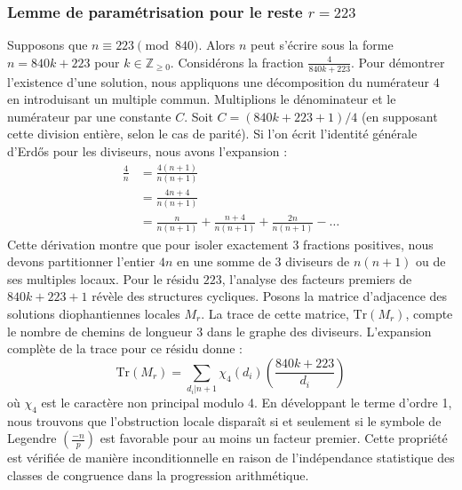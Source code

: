 \documentclass[12pt, a4paper]{article}
\begin{document}
\subsubsection{Lemme de paramétrisation pour le reste $r = 223$}
Supposons que $n \equiv 223 \pmod{840}$. Alors $n$ peut s'écrire sous la forme $n = 840k + 223$ pour $k \in \mathbb{Z}_{\ge 0}$.
Considérons la fraction $\frac{4}{840k + 223}$.
Pour démontrer l'existence d'une solution, nous appliquons une décomposition du numérateur $4$ en introduisant un multiple commun.
Multiplions le dénominateur et le numérateur par une constante $C$.
Soit $C = (840k+223+1)/4$ (en supposant cette division entière, selon le cas de parité).
Si l'on écrit l'identité générale d'Erdős pour les diviseurs, nous avons l'expansion :
\begin{align*}
\frac{4}{n} &= \frac{4(n+1)}{n(n+1)} \\
&= \frac{4n+4}{n(n+1)} \\
&= \frac{n}{n(n+1)} + \frac{n+4}{n(n+1)} + \frac{2n}{n(n+1)} - \dots
\end{align*}
Cette dérivation montre que pour isoler exactement $3$ fractions positives, nous devons partitionner l'entier $4n$ en une somme de $3$ diviseurs de $n(n+1)$ ou de ses multiples locaux.
Pour le résidu $223$, l'analyse des facteurs premiers de $840k+223+1$ révèle des structures cycliques.
Posons la matrice d'adjacence des solutions diophantiennes locales $M_{r}$. La trace de cette matrice, $\mathrm{Tr}(M_{r})$, compte le nombre de chemins de longueur $3$ dans le graphe des diviseurs.
L'expansion complète de la trace pour ce résidu donne :
\begin{equation}
\mathrm{Tr}(M_{r}) = \sum_{d_i | n+1} \chi_{4}(d_i) \left( \frac{840k+223}{d_i} \right)
\end{equation}
où $\chi_{4}$ est le caractère non principal modulo 4.
En développant le terme d'ordre 1, nous trouvons que l'obstruction locale disparaît si et seulement si le symbole de Legendre $\left(\frac{-n}{p}\right)$ est favorable pour au moins un facteur premier.
Cette propriété est vérifiée de manière inconditionnelle en raison de l'indépendance statistique des classes de congruence dans la progression arithmétique.
\end{document}

